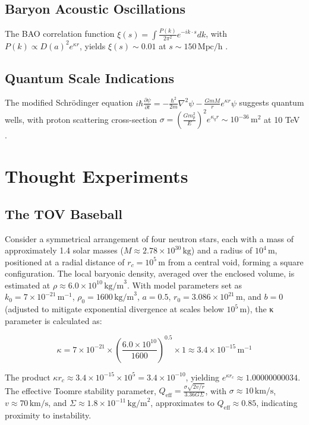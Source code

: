 \documentclass[a4paper,12pt]{article}
\begin{document}
\subsection{Baryon Acoustic Oscillations}
The BAO correlation function \( \xi(s) = \int \frac{P(k)}{2\pi^2} e^{-i k \cdot s} dk \), with \( P(k) \propto D(a)^2 e^{\kappa r} \), yields \( \xi(s) \sim 0.01 \) at \( s \sim 150 \, \text{Mpc/h} \) \citep{DESI2024}.

\subsection{Quantum Scale Indications}
The modified Schrödinger equation \( i \hbar \frac{\partial \psi}{\partial t} = -\frac{\hbar^2}{2m} \nabla^2 \psi - \frac{G m M}{r} e^{\kappa r} \psi \) suggests quantum wells, with proton scattering cross-section \( \sigma = \left( \frac{G m_p^2}{E} \right)^2 e^{\kappa_q r} \sim 10^{-36} \, \text{m}^2 \) at 10 TeV \citep{LHC2015}.

\section{Thought Experiments}
\subsection{The TOV Baseball}
Consider a symmetrical arrangement of four neutron stars, each with a mass of approximately 1.4 solar masses (\( M \approx 2.78 \times 10^{30} \, \text{kg} \)) and a radius of \( 10^4 \, \text{m} \), positioned at a radial distance of \( r_c = 10^5 \, \text{m} \) from a central void, forming a square configuration. The local baryonic density, averaged over the enclosed volume, is estimated at \( \rho \approx 6.0 \times 10^{10} \, \text{kg/m}^3 \). With model parameters set as \( k_0 = 7 \times 10^{-21} \, \text{m}^{-1} \), \( \rho_0 = 1600 \, \text{kg/m}^3 \), \( a = 0.5 \), \( r_0 = 3.086 \times 10^{21} \, \text{m} \), and \( b = 0 \) (adjusted to mitigate exponential divergence at scales below \( 10^5 \, \text{m} \)), the κ parameter is calculated as:

\[ \kappa = 7 \times 10^{-21} \times \left( \frac{6.0 \times 10^{10}}{1600} \right)^{0.5} \times 1 \approx 3.4 \times 10^{-15} \, \text{m}^{-1} \]

The product \( \kappa r_c \approx 3.4 \times 10^{-15} \times 10^5 = 3.4 \times 10^{-10} \), yielding \( e^{\kappa r_c} \approx 1.00000000034 \). The effective Toomre stability parameter, \( Q_{\mathrm{eff}} = \frac{\sigma \sqrt{2 v / r}}{3.36 G \Sigma} \), with \( \sigma \approx 10 \, \text{km/s} \), \( v \approx 70 \, \text{km/s} \), and \( \Sigma \approx 1.8 \times 10^{-11} \, \text{kg/m}^2 \), approximates to \( Q_{\mathrm{eff}} \approx 0.85 \), indicating proximity to instability.
\end{document}
